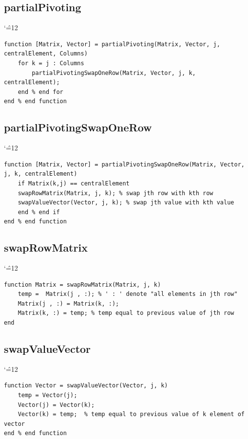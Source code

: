 \documentclass[12pt]{report}
\newenvironment{simplechar}{%
   \catcode`\^=12
}{}
\begin{document}
\subsection{partialPivoting}
\begin{simplechar}
\begin{lstlisting}
function [Matrix, Vector] = partialPivoting(Matrix, Vector, j, centralElement, Columns)
    for k = j : Columns
        partialPivotingSwapOneRow(Matrix, Vector, j, k, centralElement);
    end % end for
end % end function
\end{lstlisting}
\end{simplechar}

\newpage
\subsection{partialPivotingSwapOneRow}
\begin{simplechar}
\begin{lstlisting}
function [Matrix, Vector] = partialPivotingSwapOneRow(Matrix, Vector, j, k, centralElement)
    if Matrix(k,j) == centralElement
    swapRowMatrix(Matrix, j, k); % swap jth row with kth row
    swapValueVector(Vector, j, k); % swap jth value with kth value
    end % end if
end % end function
\end{lstlisting}
\end{simplechar}


\subsection{swapRowMatrix}
\begin{simplechar}
\begin{lstlisting}
function Matrix = swapRowMatrix(Matrix, j, k)
    temp =  Matrix(j , :); % ' : ' denote "all elements in jth row"
    Matrix(j , :) = Matrix(k, :);
    Matrix(k, :) = temp; % temp equal to previous value of jth row
end
\end{lstlisting}
\end{simplechar}

\subsection{swapValueVector}
\begin{simplechar}
\begin{lstlisting}
function Vector = swapValueVector(Vector, j, k)
    temp = Vector(j);
    Vector(j) = Vector(k);
    Vector(k) = temp;  % temp equal to previous value of k element of vector
end % end function
\end{lstlisting}
\end{simplechar}
\end{document}
